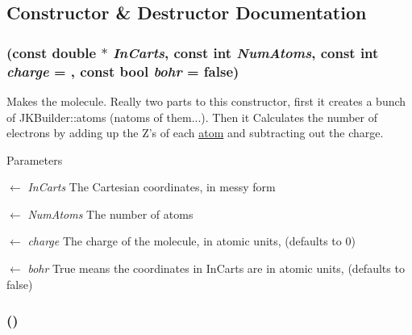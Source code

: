 \subsection{Constructor \& Destructor Documentation}
\hypertarget{classJKBuilder_1_1molecule__class_a227b81bd92795b9926c71e77fa2e3d94}{
\subsubsection[{molecule\_\-class}]{ (const double $\ast$ {\em InCarts}, \/  const int {\em NumAtoms}, \/  const int {\em charge} = {}, \/  const bool {\em bohr} = {\ttfamily false})}}
\label{classJKBuilder_1_1molecule__class_a227b81bd92795b9926c71e77fa2e3d94}


Makes the molecule. Really two parts to this constructor, first it creates a bunch of JKBuilder::atoms (natoms of them...). Then it Calculates the number of electrons by adding up the Z's of each \hyperlink{classJKBuilder_1_1atom}{atom} and subtracting out the charge.


\begin{DoxyParams}{Parameters}
\item[\mbox{$\leftarrow$} {\em InCarts}]The Cartesian coordinates, in messy form \item[\mbox{$\leftarrow$} {\em NumAtoms}]The number of atoms \item[\mbox{$\leftarrow$} {\em charge}]The charge of the molecule, in atomic units, (defaults to 0) \item[\mbox{$\leftarrow$} {\em bohr}]True means the coordinates in InCarts are in atomic units, (defaults to false) \end{DoxyParams}
\hypertarget{classJKBuilder_1_1molecule__class_a60295ae66e9fad98bd3feaa08a443d6d}{
\subsubsection[{molecule\_\-class}]{ ()}}
\label{classJKBuilder_1_1molecule__class_a60295ae66e9fad98bd3feaa08a443d6d}


